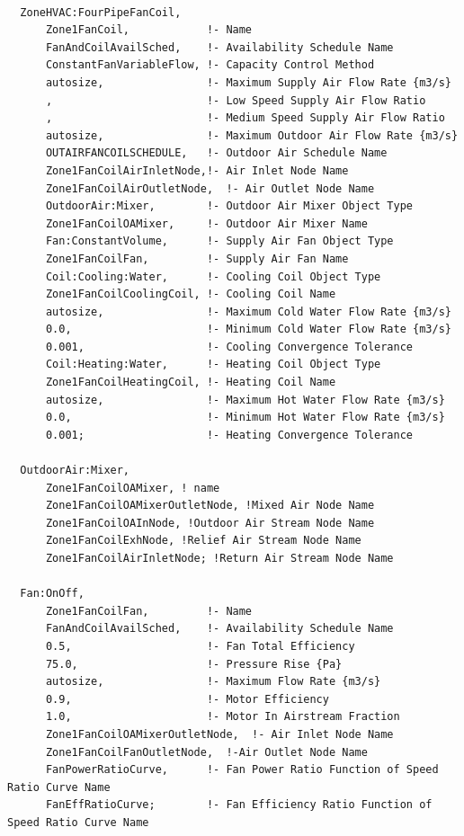 \begin{lstlisting}

  ZoneHVAC:FourPipeFanCoil,
      Zone1FanCoil,            !- Name
      FanAndCoilAvailSched,    !- Availability Schedule Name
      ConstantFanVariableFlow, !- Capacity Control Method
      autosize,                !- Maximum Supply Air Flow Rate {m3/s}
      ,                        !- Low Speed Supply Air Flow Ratio
      ,                        !- Medium Speed Supply Air Flow Ratio
      autosize,                !- Maximum Outdoor Air Flow Rate {m3/s}
      OUTAIRFANCOILSCHEDULE,   !- Outdoor Air Schedule Name
      Zone1FanCoilAirInletNode,!- Air Inlet Node Name
      Zone1FanCoilAirOutletNode,  !- Air Outlet Node Name
      OutdoorAir:Mixer,        !- Outdoor Air Mixer Object Type
      Zone1FanCoilOAMixer,     !- Outdoor Air Mixer Name
      Fan:ConstantVolume,      !- Supply Air Fan Object Type
      Zone1FanCoilFan,         !- Supply Air Fan Name
      Coil:Cooling:Water,      !- Cooling Coil Object Type
      Zone1FanCoilCoolingCoil, !- Cooling Coil Name
      autosize,                !- Maximum Cold Water Flow Rate {m3/s}
      0.0,                     !- Minimum Cold Water Flow Rate {m3/s}
      0.001,                   !- Cooling Convergence Tolerance
      Coil:Heating:Water,      !- Heating Coil Object Type
      Zone1FanCoilHeatingCoil, !- Heating Coil Name
      autosize,                !- Maximum Hot Water Flow Rate {m3/s}
      0.0,                     !- Minimum Hot Water Flow Rate {m3/s}
      0.001;                   !- Heating Convergence Tolerance

  OutdoorAir:Mixer,
      Zone1FanCoilOAMixer, ! name
      Zone1FanCoilOAMixerOutletNode, !Mixed Air Node Name
      Zone1FanCoilOAInNode, !Outdoor Air Stream Node Name
      Zone1FanCoilExhNode, !Relief Air Stream Node Name
      Zone1FanCoilAirInletNode; !Return Air Stream Node Name

  Fan:OnOff,
      Zone1FanCoilFan,         !- Name
      FanAndCoilAvailSched,    !- Availability Schedule Name
      0.5,                     !- Fan Total Efficiency
      75.0,                    !- Pressure Rise {Pa}
      autosize,                !- Maximum Flow Rate {m3/s}
      0.9,                     !- Motor Efficiency
      1.0,                     !- Motor In Airstream Fraction
      Zone1FanCoilOAMixerOutletNode,  !- Air Inlet Node Name
      Zone1FanCoilFanOutletNode,  !-Air Outlet Node Name
      FanPowerRatioCurve,      !- Fan Power Ratio Function of Speed Ratio Curve Name
      FanEffRatioCurve;        !- Fan Efficiency Ratio Function of Speed Ratio Curve Name


\end{lstlisting}

